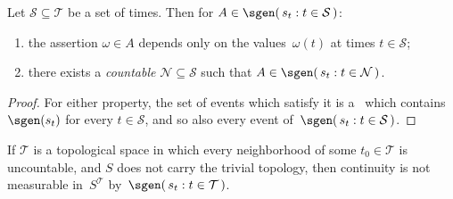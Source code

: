\begin	{proposition}
Let \( \mathcal S \subseteq \mathcal T \) be a set of times.
Then for \( A \in \sgen(\, s_t : t \in \mathcal S \,) \):
\begin	{enumerate}
\item	the assertion \( \omega \in A \) depends only on the values~$\omega(t)$
	at times \( t \in \mathcal S \);
\item	there exists a \emph{countable} \( \mathcal N \subseteq \mathcal S \)
	such that \( A \in \sgen(\, s_t : t \in \mathcal N \,) \).
\end	{enumerate}
\end	{proposition}
\begin	{proof}
For either property, the set of events which satisfy it
is a \salg\ which contains $\sgen(s_t)$ for every \( t \in \mathcal S \),
and so also every event of~\( \sgen(\, s_t : t \in \mathcal S \,) \).
\end	{proof}

\begin	{corollary}
If $\mathcal T$ is a topological space
in which every neighborhood of some \( t_0 \in \mathcal T \) is uncountable,
and $S$ does not carry the trivial topology,
then continuity is not measurable in~$S^{\mathcal T}$
by~\( \sgen(\, s_t : t \in \mathcal T \,) \).
\end	{corollary}
